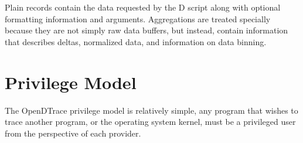 Plain records contain the data requested by the D script along with
optional formatting information and arguments.  Aggregations are
treated specially because they are not simply raw data buffers, but
instead, contain information that describes deltas, normalized data,
and information on data binning.

\section{Privilege Model}
\label{sec:privilege}


The OpenDTrace privilege model is relatively simple, any program that
wishes to trace another program, or the operating system kernel, must
be a privileged user from the perspective of each provider.

